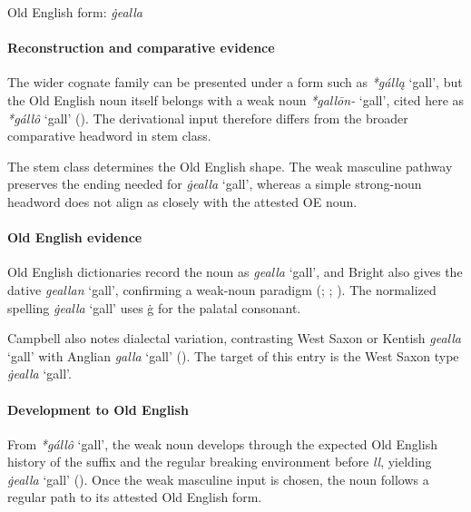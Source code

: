 \documentclass[
  british,
  a4paper,
]{article}
\providecommand{\Recon}[1]{\emph{*#1}}
\begin{document}
Old English form: \emph{ġealla}

\paragraph{Reconstruction and comparative
evidence}\label{reconstruction-and-comparative-evidence-98}

The wider cognate family can be presented under a form such as
\Recon{gállą} `gall', but the Old English noun itself belongs with a
weak noun \emph{*gallōn-} `gall', cited here as \Recon{gállô} `gall'
(). The derivational input
therefore differs from the broader comparative headword in stem class.

The stem class determines the Old English shape. The weak masculine
pathway preserves the ending needed for \emph{ġealla} `gall', whereas a
simple strong-noun headword does not align as closely with the attested
OE noun.

\paragraph{Old English evidence}\label{old-english-evidence-100}

Old English dictionaries record the noun as {\emph{gealla}} `gall', and
Bright also gives the dative {\emph{geallan}} `gall', confirming a
weak-noun paradigm (; ;
). The
normalized spelling {\emph{ġealla}} `gall' uses ġ for the palatal
consonant.

Campbell also notes dialectal variation, contrasting West Saxon or
Kentish {\emph{gealla}} `gall' with Anglian {\emph{galla}} `gall'
(). The target of
this entry is the West Saxon type {\emph{ġealla}} `gall'.

\paragraph{Development to Old
English}\label{development-to-old-english-98}

From \Recon{gállô} `gall', the weak noun develops through the expected
Old English history of the suffix and the regular breaking environment
before \emph{ll}, yielding {\emph{ġealla}} `gall'
(). Once the weak
masculine input is chosen, the noun follows a regular path to its
attested Old English form.
\end{document}
